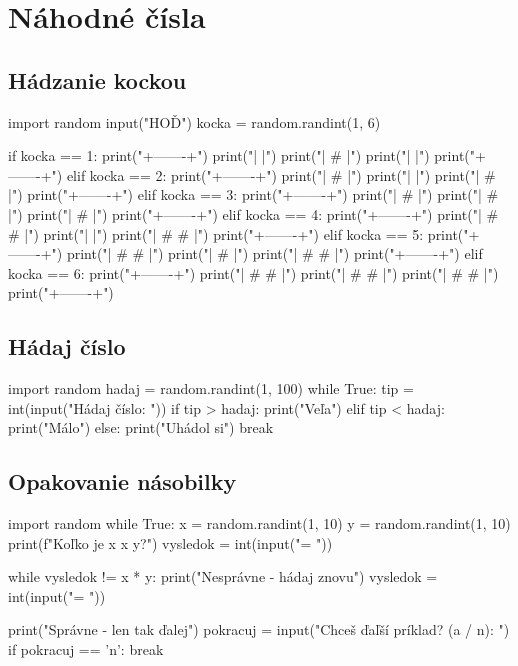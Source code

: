 \section{Náhodné čísla}
\subsection{Hádzanie kockou}

\begin{solution}
import random
input("HOĎ")
kocka = random.randint(1, 6)

if kocka == 1:
	print("+-------+")
	print("|       |")
	print("|   #   |")
	print("|       |")
	print("+-------+")
elif kocka == 2:
	print("+-------+")
	print("| #     |")
	print("|       |")
	print("|     # |")
	print("+-------+")
elif kocka == 3:
	print("+-------+")
	print("| #     |")
	print("|   #   |")
	print("|     # |")
	print("+-------+")
elif kocka == 4:
	print("+-------+")
	print("| #   # |")
	print("|       |")
	print("| #   # |")
	print("+-------+")
elif kocka == 5:
	print("+-------+")
	print("| #   # |")
	print("|   #   |")
	print("| #   # |")
	print("+-------+")
elif kocka == 6:
	print("+-------+")
	print("| #   # |")
	print("| #   # |")
	print("| #   # |")
	print("+-------+")
\end{solution}

\subsection{Hádaj číslo}
\begin{solution}
import random
hadaj = random.randint(1, 100)
while True:
	tip = int(input("Hádaj číslo: "))
	if tip > hadaj:
		print("Veľa")
	elif tip < hadaj:
        print("Málo")
    else:
        print("Uhádol si")
        break
\end{solution}


\subsection{Opakovanie násobilky}
\begin{solution}
import random
while True:
    x = random.randint(1, 10)
    y = random.randint(1, 10)
    print(f"Koľko je {x} x {y}?")
    vysledok = int(input("= "))

    while vysledok != x * y:
        print("Nesprávne - hádaj znovu")
        vysledok = int(input("= "))

    print("Správne - len tak ďalej")
    pokracuj = input("Chceš ďaľší príklad? (a / n): ")
    if pokracuj == 'n':
        break
\end{solution}
